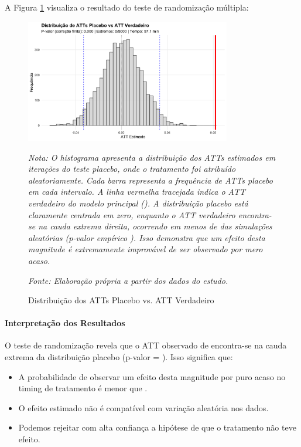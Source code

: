 \documentclass[
	12pt,				%
	oneside,			%
	a4paper,			%
	english,			%
	french,				%
	spanish,			%
	brazil				%
	]{abntex2}
\begin{document}
A Figura \ref{fig:placebo} visualiza o resultado do teste de randomização múltipla:

\begin{figure}[H]
\centering
\caption{Distribuição dos ATTs Placebo vs. ATT Verdadeiro}
\label{fig:placebo}
\includegraphics[width=0.8\textwidth]{../../../data/outputs/placebo_distribution.png}

\textit{Nota: O histograma apresenta a distribuição dos ATTs estimados em \placebonsims{} iterações do teste placebo, onde o tratamento foi atribuído aleatoriamente. Cada barra representa a frequência de ATTs placebo em cada intervalo. A linha vermelha tracejada indica o ATT verdadeiro do modelo principal (\placebotruatt). A distribuição placebo está claramente centrada em zero, enquanto o ATT verdadeiro encontra-se na cauda extrema direita, ocorrendo em menos de \placebopvaluepct{} das simulações aleatórias (p-valor empírico \placebopvalue). Isso demonstra que um efeito desta magnitude é extremamente improvável de ser observado por mero acaso.}

\textit{Fonte: Elaboração própria a partir dos dados do estudo.}
\end{figure}

\paragraph{Interpretação dos Resultados}

O teste de randomização revela que o ATT observado de \placebotruatt{} encontra-se na cauda extrema da distribuição placebo (p-valor = \placebopvalue). Isso significa que:

\begin{itemize}
\item A probabilidade de observar um efeito desta magnitude por puro acaso no timing de tratamento é menor que \placebopvaluepct{}.
\item O efeito estimado não é compatível com variação aleatória nos dados.
\item Podemos rejeitar com alta confiança a hipótese de que o tratamento não teve efeito.
\end{itemize}
\end{document}
